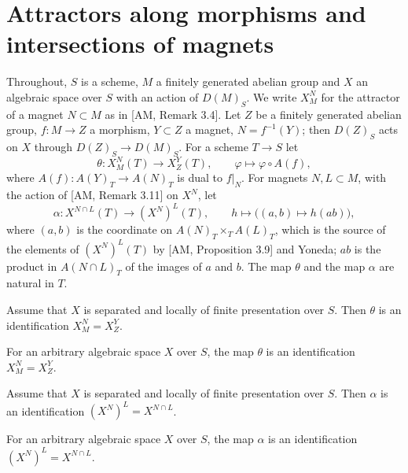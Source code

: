 
\section{Attractors along morphisms and intersections of magnets}

Throughout, $S$ is a scheme, $M$ a finitely generated abelian group and $X$ an algebraic space over $S$ with an action of $D(M)_S$. We write $X^{N}_{M}$ for the attractor of a magnet $N\subset M$ as in [AM, Remark 3.4]. Let $Z$ be a finitely generated abelian group, $f\colon M\to Z$ a morphism, $Y\subset Z$ a magnet, $N=f^{-1}(Y)$; then $D(Z)_S$ acts on $X$ through $D(Z)_S\to D(M)_S$. For a scheme $T\to S$ let
\[
\theta\colon X^{N}_{M}(T)\to X^{Y}_{Z}(T),\qquad \varphi\mapsto\varphi\circ A(f),
\]
where $A(f)\colon A(Y)_T\to A(N)_T$ is dual to $f|_N$. For magnets $N,L\subset M$, with the action of [AM, Remark 3.11] on $X^N$, let
\[
\alpha\colon X^{N\cap L}(T)\to (X^{N})^{L}(T),\qquad h\mapsto\big((a,b)\mapsto h(ab)\big),
\]
where $(a,b)$ is the coordinate on $A(N)_T\times_T A(L)_T$, which is the source of the elements of $(X^N)^L(T)$ by [AM, Proposition 3.9] and Yoneda; $ab$ is the product in $A(N\cap L)_T$ of the images of $a$ and $b$. The map $\theta$ and the map $\alpha$ are natural in $T$.

\begin{theorem}\label{thm:331A}
Assume that $X$ is separated and locally of finite presentation over $S$. Then $\theta$ is an identification $X^{N}_{M}=X^{Y}_{Z}$.
\end{theorem}

\begin{theorem}\label{thm:331B}
For an arbitrary algebraic space $X$ over $S$, the map $\theta$ is an identification $X^{N}_{M}=X^{Y}_{Z}$.
\end{theorem}

\begin{theorem}\label{thm:332A}
Assume that $X$ is separated and locally of finite presentation over $S$. Then $\alpha$ is an identification $(X^{N})^{L}=X^{N\cap L}$.
\end{theorem}

\begin{theorem}\label{thm:332B}
For an arbitrary algebraic space $X$ over $S$, the map $\alpha$ is an identification $(X^{N})^{L}=X^{N\cap L}$.
\end{theorem}

